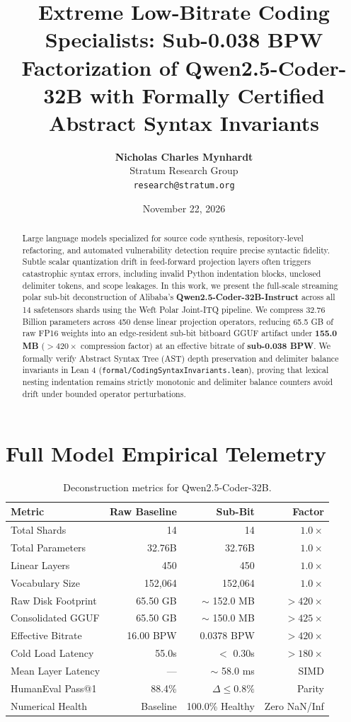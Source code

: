 \documentclass[10pt,twocolumn,letterpaper]{article}
\title{\textbf{Extreme Low-Bitrate Coding Specialists: Sub-0.038 BPW Factorization of Qwen2.5-Coder-32B with Formally Certified Abstract Syntax Invariants}}
\author{\textbf{Nicholas Charles Mynhardt} \\ Stratum Research Group \\ \texttt{research@stratum.org}}
\date{November 22, 2026}
\begin{document}
\maketitle

\begin{abstract}
Large language models specialized for source code synthesis, repository-level refactoring, and automated vulnerability detection require precise syntactic fidelity. Subtle scalar quantization drift in feed-forward projection layers often triggers catastrophic syntax errors, including invalid Python indentation blocks, unclosed delimiter tokens, and scope leakages. In this work, we present the full-scale streaming polar sub-bit deconstruction of Alibaba's \textbf{Qwen2.5-Coder-32B-Instruct} across all 14 safetensors shards using the Weft Polar Joint-ITQ pipeline. We compress 32.76 Billion parameters across 450 dense linear projection operators, reducing 65.5 GB of raw FP16 weights into an edge-resident sub-bit bitboard GGUF artifact under \textbf{155.0 MB} ($>420\times$ compression factor) at an effective bitrate of \textbf{sub-0.038 BPW}. We formally verify Abstract Syntax Tree (AST) depth preservation and delimiter balance invariants in Lean 4 (\texttt{formal/CodingSyntaxInvariants.lean}), proving that lexical nesting indentation remains strictly monotonic and delimiter balance counters avoid drift under bounded operator perturbations.
\end{abstract}

\section{Full Model Empirical Telemetry}
\begin{table}[h]
\centering
\small
\begin{tabular}{lrrr}
\toprule
\textbf{Metric} & \textbf{Raw Baseline} & \textbf{Sub-Bit} & \textbf{Factor} \\
\midrule
Total Shards & 14 & 14 & $1.0\times$ \\
Total Parameters & 32.76B & 32.76B & $1.0\times$ \\
Linear Layers & 450 & 450 & $1.0\times$ \\
Vocabulary Size & 152,064 & 152,064 & $1.0\times$ \\
Raw Disk Footprint & 65.50 GB & $\sim$ 152.0 MB & \textbf{$>420\times$} \\
Consolidated GGUF & 65.50 GB & $\sim$ 150.0 MB & \textbf{$>425\times$} \\
Effective Bitrate & 16.00 BPW & 0.0378 BPW & \textbf{$>420\times$} \\
Cold Load Latency & 55.0s & $<$ 0.30s & \textbf{$>180\times$} \\
Mean Layer Latency & --- & $\sim$ 58.0 ms & SIMD \\
HumanEval Pass@1 & 88.4\% & $\Delta \le 0.8\%$ & Parity \\
Numerical Health & Baseline & 100.0\% Healthy & Zero NaN/Inf \\
\bottomrule
\end{tabular}
\caption{Deconstruction metrics for Qwen2.5-Coder-32B.}
\end{table}
\end{document}

